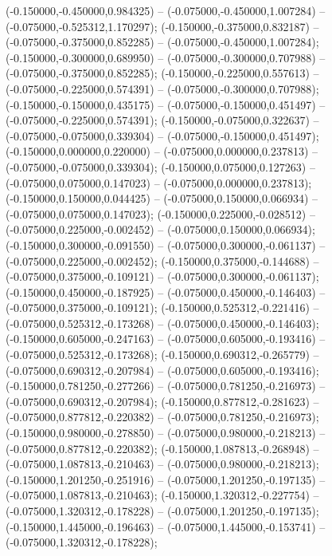 (-0.150000,-0.450000,0.984325) -- (-0.075000,-0.450000,1.007284) -- (-0.075000,-0.525312,1.170297);
 (-0.150000,-0.375000,0.832187) -- (-0.075000,-0.375000,0.852285) -- (-0.075000,-0.450000,1.007284);
 (-0.150000,-0.300000,0.689950) -- (-0.075000,-0.300000,0.707988) -- (-0.075000,-0.375000,0.852285);
 (-0.150000,-0.225000,0.557613) -- (-0.075000,-0.225000,0.574391) -- (-0.075000,-0.300000,0.707988);
 (-0.150000,-0.150000,0.435175) -- (-0.075000,-0.150000,0.451497) -- (-0.075000,-0.225000,0.574391);
 (-0.150000,-0.075000,0.322637) -- (-0.075000,-0.075000,0.339304) -- (-0.075000,-0.150000,0.451497);
 (-0.150000,0.000000,0.220000) -- (-0.075000,0.000000,0.237813) -- (-0.075000,-0.075000,0.339304);
 (-0.150000,0.075000,0.127263) -- (-0.075000,0.075000,0.147023) -- (-0.075000,0.000000,0.237813);
 (-0.150000,0.150000,0.044425) -- (-0.075000,0.150000,0.066934) -- (-0.075000,0.075000,0.147023);
 (-0.150000,0.225000,-0.028512) -- (-0.075000,0.225000,-0.002452) -- (-0.075000,0.150000,0.066934);
 (-0.150000,0.300000,-0.091550) -- (-0.075000,0.300000,-0.061137) -- (-0.075000,0.225000,-0.002452);
 (-0.150000,0.375000,-0.144688) -- (-0.075000,0.375000,-0.109121) -- (-0.075000,0.300000,-0.061137);
 (-0.150000,0.450000,-0.187925) -- (-0.075000,0.450000,-0.146403) -- (-0.075000,0.375000,-0.109121);
 (-0.150000,0.525312,-0.221416) -- (-0.075000,0.525312,-0.173268) -- (-0.075000,0.450000,-0.146403);
 (-0.150000,0.605000,-0.247163) -- (-0.075000,0.605000,-0.193416) -- (-0.075000,0.525312,-0.173268);
 (-0.150000,0.690312,-0.265779) -- (-0.075000,0.690312,-0.207984) -- (-0.075000,0.605000,-0.193416);
 (-0.150000,0.781250,-0.277266) -- (-0.075000,0.781250,-0.216973) -- (-0.075000,0.690312,-0.207984);
 (-0.150000,0.877812,-0.281623) -- (-0.075000,0.877812,-0.220382) -- (-0.075000,0.781250,-0.216973);
 (-0.150000,0.980000,-0.278850) -- (-0.075000,0.980000,-0.218213) -- (-0.075000,0.877812,-0.220382);
 (-0.150000,1.087813,-0.268948) -- (-0.075000,1.087813,-0.210463) -- (-0.075000,0.980000,-0.218213);
 (-0.150000,1.201250,-0.251916) -- (-0.075000,1.201250,-0.197135) -- (-0.075000,1.087813,-0.210463);
 (-0.150000,1.320312,-0.227754) -- (-0.075000,1.320312,-0.178228) -- (-0.075000,1.201250,-0.197135);
 (-0.150000,1.445000,-0.196463) -- (-0.075000,1.445000,-0.153741) -- (-0.075000,1.320312,-0.178228);
